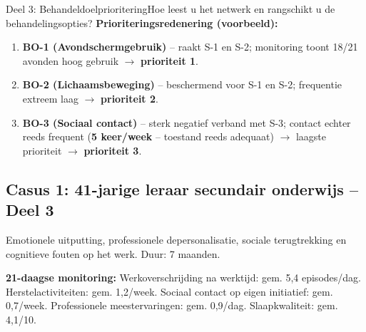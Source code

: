 \documentclass[11pt,a4paper]{article}
\begin{document}
\begin{voorbeeldbox}{Deel 3: Behandeldoelprioritering}{Hoe leest u het netwerk en rangschikt u de behandelingsopties?}
\medskip
\textbf{Prioriteringsredenering (voorbeeld):}
\begin{enumerate}[topsep=2pt,itemsep=1pt,label=\arabic*.]
\item \textbf{BO-1 (Avondschermgebruik)} -- raakt S-1 en S-2; monitoring toont 18/21 avonden hoog gebruik $\rightarrow$ \textbf{prioriteit 1}.
\item \textbf{BO-2 (Lichaamsbeweging)} -- beschermend voor S-1 en S-2; frequentie extreem laag $\rightarrow$ \textbf{prioriteit 2}.
\item \textbf{BO-3 (Sociaal contact)} -- sterk negatief verband met S-3; contact echter reeds frequent (\textbf{5 keer/week} -- toestand reeds adequaat) $\rightarrow$ laagste prioriteit $\rightarrow$ \textbf{prioriteit 3}.
\end{enumerate}
\end{voorbeeldbox}

\vspace{0.5em}

\newpage
\subsection*{Casus 1: 41-jarige leraar secundair onderwijs -- Deel 3}

\begin{complaintbox}[title={Casus 1: 41-jarige leraar secundair onderwijs}]
\small Emotionele uitputting, professionele depersonalisatie, sociale terugtrekking en cognitieve fouten op het werk. Duur: 7 maanden.
\end{complaintbox}

\begin{monitorbox}
\small\textbf{21-daagse monitoring:} Werkoverschrijding na werktijd: gem. 5,4 episodes/dag. Herstelactiviteiten: gem. 1,2/week. Sociaal contact op eigen initiatief: gem. 0,7/week. Professionele meestervaringen: gem. 0,9/dag. Slaapkwaliteit: gem. 4,1/10.
\end{monitorbox}
\end{document}
